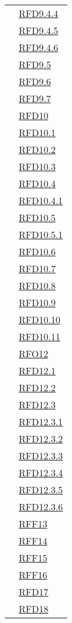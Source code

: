 \begin{longtable}{|>{\centering}m{5cm}|m{5cm}<{\centering}|}
& \hyperlink{RFD9.4.4}{RFD9.4.4}\\
& \hyperlink{RFD9.4.5}{RFD9.4.5}\\
& \hyperlink{RFD9.4.6}{RFD9.4.6}\\
& \hyperlink{RFD9.5}{RFD9.5}\\
& \hyperlink{RFD9.6}{RFD9.6}\\
& \hyperlink{RFD9.7}{RFD9.7}\\
& \hyperlink{RFD10}{RFD10}\\
& \hyperlink{RFD10.1}{RFD10.1}\\
& \hyperlink{RFD10.2}{RFD10.2}\\
& \hyperlink{RFD10.3}{RFD10.3}\\
& \hyperlink{RFD10.4}{RFD10.4}\\
& \hyperlink{RFD10.4.1}{RFD10.4.1}\\
& \hyperlink{RFD10.5}{RFD10.5}\\
& \hyperlink{RFD10.5.1}{RFD10.5.1}\\
& \hyperlink{RFD10.6}{RFD10.6}\\
& \hyperlink{RFD10.7}{RFD10.7}\\
& \hyperlink{RFD10.8}{RFD10.8}\\
& \hyperlink{RFD10.9}{RFD10.9}\\
& \hyperlink{RFD10.10}{RFD10.10}\\
& \hyperlink{RFD10.11}{RFD10.11}\\
& \hyperlink{RFO12}{RFO12}\\
& \hyperlink{RFD12.1}{RFD12.1}\\
& \hyperlink{RFD12.2}{RFD12.2}\\
& \hyperlink{RFD12.3}{RFD12.3}\\
& \hyperlink{RFD12.3.1}{RFD12.3.1}\\
& \hyperlink{RFD12.3.2}{RFD12.3.2}\\
& \hyperlink{RFD12.3.3}{RFD12.3.3}\\
& \hyperlink{RFD12.3.4}{RFD12.3.4}\\
& \hyperlink{RFD12.3.5}{RFD12.3.5}\\
& \hyperlink{RFD12.3.6}{RFD12.3.6}\\
& \hyperlink{RFF13}{RFF13}\\
& \hyperlink{RFF14}{RFF14}\\
& \hyperlink{RFF15}{RFF15}\\
& \hyperlink{RFF16}{RFF16}\\
& \hyperlink{RFD17}{RFD17}\\
& \hyperlink{RFD18}{RFD18}\\

\end{longtable}

